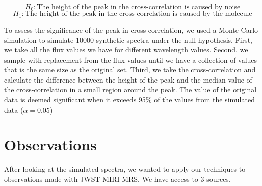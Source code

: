 \documentclass[twoside, single, authoryear, semicolon]{lion-msc}
\newcommand{\4}{$_4$}
\newcommand{\3}{$_3$}
\newcommand{\2}{$_2$}
\begin{document}
\begin{equation}
    H_0: \text{The height of the peak in the cross-correlation is caused by noise}
\end{equation}
\begin{equation}
    H_1: \text{The height of the peak in the cross-correlation is caused by the molecule}
\end{equation}

To assess the significance of the peak in cross-correlation, we used a Monte Carlo simulation to simulate 10000 synthetic spectra under the null hypothesis. First, we take all the flux values we have for different wavelength values. Second, we sample with replacement from the flux values until we have a collection of values that is the same size as the original set. Third, we take the cross-correlation and calculate the difference between the height of the peak and the median value of the cross-correlation in a small region around the peak. The value of the original data is deemed significant when it exceeds 95\% of the values from the simulated data ($\alpha=0.05$)


\section{Observations}
After looking at the simulated spectra, we wanted to apply our techniques to observations made with JWST MIRI MRS. We have access to 3 sources. 
\end{document}
